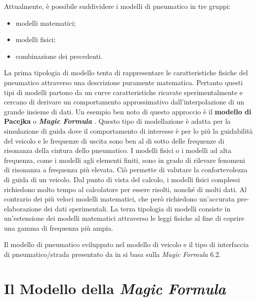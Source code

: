 Attualmente, è possibile suddividere i modelli di pneumatico in tre gruppi:
\begin{itemize}
	\item modelli matematici;
	\item modelli fisici;
	\item combinazione dei precedenti.
\end{itemize}

\noindent
La prima tipologia di modello tenta di rappresentare le caratteristiche fisiche del pneumatico attraverso una descrizione puramente matematica. Pertanto questi tipi di modelli partono da un curve caratteristiche ricavate sperimentalmente e cercano di derivare un comportamento approssimativo dall'interpolazione di un grande insieme di dati. Un esempio ben noto di questo approccio è il \textbf{modello di Pacejka} o \textbf{\textit{Magic Formula}} \cite{hans}. Questo tipo di modellazione è adatta per la simulazione di guida dove il comportamento di interesse è per lo più la guidabilità del veicolo e le frequenze di uscita sono ben al di sotto delle frequenze di risonanza della cintura dello pneumatico. I modelli fisici o i modelli ad alta frequenza, come i modelli agli elementi finiti, sono in grado di rilevare fenomeni di risonanza a frequenza più elevata. Ciò permette di valutare la confortevolezza di guida di un veicolo. Dal punto di vista del calcolo, i modelli fisici complessi richiedono molto tempo al calcolatore per essere risolti, nonché di molti dati. Al contrario dei più veloci modelli matematici, che però richiedono un'accurata pre-elaborazione dei dati sperimentali. La terza tipologia di modelli consiste in un'estensione dei modelli matematici attraverso le leggi fisiche al fine di coprire una gamma di frequenza più ampia.

Il modello di pneumatico sviluppato nel modello di veicolo e il tipo di interfaccia di pneumatico/strada presentato da \citeauthor{Larcher} in \cite{Larcher} si basa sulla \textit{Magic Formula} 6.2.
%
\section{Il Modello della \textit{Magic Formula}}
%
